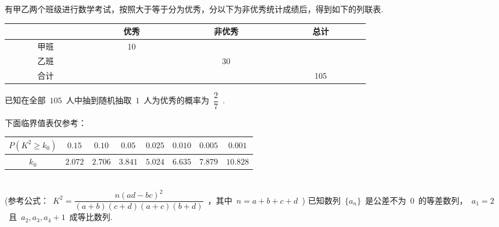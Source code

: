 \documentclass[printbox]{BHCexam}
\begin{document}
\begin{questions}
\vspace{6cm}
\question 有甲乙两个班级进行数学考试，按照大于等于分为优秀，分以下为非优秀统计成绩后，得到如下的列联表.
\begin{center}
\begin{tabular}{|c|c|c|c|}
\hline
~~~~~~~{}~~~~~~~&~~~~~~~优秀~~~~~~~&~~~~~~~非优秀~~~~~~~&~~~~~~~总计~~~~~~~\\
\hline
~~~~~~~甲班~~~~~~~&~~~~~~~10~~~~~~~&~~~~~~~{}~~~~~~~&~~~~~~~{}~~~~~~~\\
\hline
~~~~~~~乙班~~~~~~~&~~~~~~~{}~~~~~~~&~~~~~~~30~~~~~~~&~~~~~~~{}~~~~~~~\\
\hline
~~~~~~~合计~~~~~~~&~~~~~~~{}~~~~~~~&~~~~~~~{}~~~~~~~&~~~~~~~105~~~~~~~\\
\hline
\end{tabular}
\end{center}
已知在全部~$105$~人中抽到随机抽取~$1$~人为优秀的概率为~$\dfrac{2}{7}$~.
下面临界值表仅参考：
\begin{tabular}{|c|c|c|c|c|c|c|c|}
\hline
$P(K^2\geq k_0)$&$0.15$&$0.10$&$0.05$&$0.025$&$0.010$&$0.005$&$0.001$\\
\hline
$k_0$&$2.072$&$2.706$&$3.841$&$5.024$&$6.635$&$7.879$&$10.828$\\
\hline
\end{tabular}\\
(参考公式：~$K^2=\dfrac{n(ad-bc)^2}{(a+b)(c+d)(a+c)(b+d)}$~，其中~$n=a+b+c+d$~)
\vspace{8cm}
\question 已知数列~$\{a_n \}$~是公差不为~$0$~的等差数列，~$a_1=2$~且~$a_2,a_3,a_4+1$~成等比数列.
\begin{parts}

\end{parts}
\end{questions}
\end{document}
